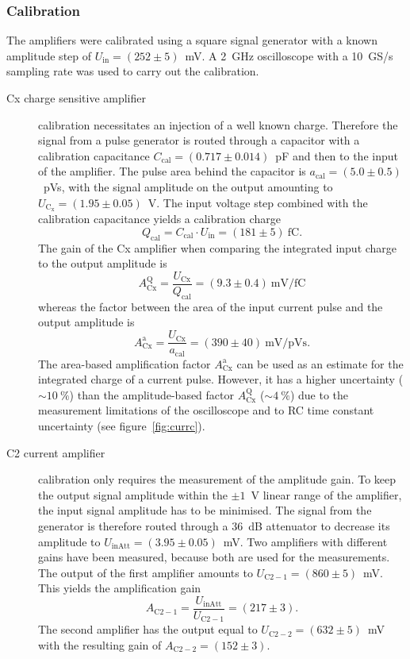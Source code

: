 \subsubsection{Calibration}
The amplifiers were calibrated using a square signal generator with a known amplitude step of $U_{\mathrm{in}}=(252\pm5)$~mV. A 2~GHz oscilloscope with a 10~GS/s sampling rate was used to carry out the calibration. 

\begin{description}
\item[Cx charge sensitive amplifier] calibration necessitates an injection of a well known charge. Therefore the signal from a pulse generator is routed through a capacitor with a calibration capacitance $C_{\mathrm{cal}}=(0.717\pm0.014)$~pF and then to the input of the amplifier. The pulse area behind the capacitor is $a_{\mathrm{cal}}=(5.0\pm0.5)$~pVs, with the signal amplitude on the output amounting to $U_{\mathrm{C_x}}=(1.95\pm0.05)$~V. The input voltage step combined with the calibration capacitance yields a calibration charge
\begin{equation}
Q_{\mathrm{cal}}=C_{\mathrm{cal}}\cdot U_{\mathrm{in}}=(181\pm5)~\mathrm{fC}.
\end{equation}
The gain of the Cx amplifier when comparing the integrated input charge to the output amplitude is 
\begin{equation}
A^{\mathrm{Q}}_{\mathrm{Cx}}=\frac{U_{\mathrm{Cx}}}{Q_{\mathrm{cal}} }=(9.3\pm0.4)~\mathrm{mV/fC}
\end{equation}
whereas the factor between the area of the input current pulse and the output amplitude is 
\begin{equation}
A^{\mathrm{a}}_{\mathrm{Cx}}=\frac{U_{\mathrm{Cx}}}{a_{\mathrm{cal}} }=(390\pm40)~\mathrm{mV/pVs}. 
\end{equation}
The area-based amplification factor $A^{\mathrm{a}}_{\mathrm{Cx}}$ can be used as an estimate for the integrated charge of a current pulse. However, it has a higher uncertainty ($\sim10~\%$) than the amplitude-based factor $A^{\mathrm{Q}}_{\mathrm{Cx}}$ ($\sim4~\%$) due to the measurement limitations of the oscilloscope and to RC time constant uncertainty (see figure~\ref{fig:currc}).

\item[C2 current amplifier] calibration only requires the measurement of the amplitude gain. To keep the output signal amplitude within the $\pm1$~V linear range of the amplifier, the input signal amplitude has to be minimised. The signal from the generator is therefore routed through a 36~dB attenuator to decrease its amplitude to $U_{\mathrm{inAtt}}=(3.95\pm0.05)$~mV. Two amplifiers with different gains have been measured, because both are used for the measurements. The output of the first amplifier amounts to $U_{\mathrm{C2-1}}=(860\pm5)$~mV. This yields the amplification gain 
\begin{equation}
A_{\mathrm{C2-1}}=\frac{U_{\mathrm{inAtt}}}{U_{\mathrm{C2-1}}} =(217\pm3). 
\end{equation}
The second amplifier has the output equal to $U_{\mathrm{C2-2}}=(632\pm5)$~mV with the resulting gain of $A_{\mathrm{C2-2}}=(152\pm3)$. 
\end{description}


